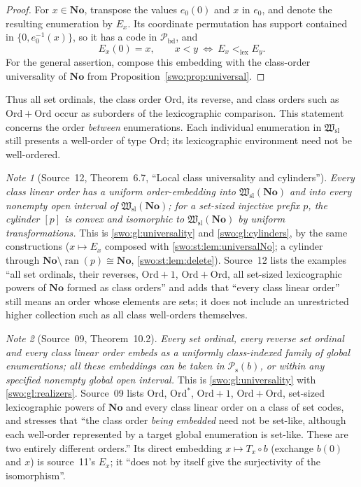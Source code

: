 \documentclass[11pt]{article}
\theoremstyle{definition}
\theoremstyle{remark}
\newtheorem{note}[note]{Note}
\newcommand{\No}{\mathbf{No}}
\newcommand{\Ord}{\mathrm{Ord}}
\newcommand{\Hsl}{\mathfrak W_{\mathrm{sl}}}
\newcommand{\Pbd}{\mathcal P_{\mathrm{bd}}}
\newcommand{\Psupp}{\mathcal P_{\mathrm{s}}}
\newcommand{\lex}{\mathrm{lex}}
\newcommand{\ran}{\operatorname{ran}}
\begin{document}
\begin{proof}
For $x\in\No$, transpose the values $e_0(0)$ and $x$ in $e_0$, and denote
the resulting enumeration by $E_x$.  Its coordinate permutation has support
contained in $\{0,e_0^{-1}(x)\}$, so it has a code in $\Pbd$, and
\[
 E_x(0)=x,\qquad x<y\ \Longleftrightarrow\ E_x<_{\lex}E_y.
\]
For the general assertion, compose this embedding with the class-order
universality of $\No$ from Proposition~\ref{swo:prop:universal}.
\end{proof}

Thus all set ordinals, the class order $\Ord$, its reverse, and class orders
such as $\Ord+\Ord$ occur as suborders of the lexicographic comparison.
This statement concerns the order \emph{between} enumerations.  Each
individual enumeration in $\Hsl$ still presents a well-order of type
$\Ord$; its lexicographic environment need not be well-ordered.


\begin{note}[Source~12, Theorem~6.7, ``Local class universality and cylinders'']\label{swo:st:thm:local}
\emph{Every class linear order has a uniform order-embedding into $\Hsl(\No)$
and into every nonempty open interval of $\Hsl(\No)$; for a set-sized
injective prefix $p$, the cylinder $[p]$ is convex and isomorphic to
$\Hsl(\No)$ by uniform transformations.} This is \cref{swo:gl:universality}
and \cref{swo:gl:cylinders}, by the same constructions ($x\mapsto E_x$
composed with \cref{swo:st:lem:universalNo}; a cylinder through
$\No\setminus\ran(p)\cong\No$, \cref{swo:st:lem:delete}). Source~12 lists
the examples ``all set ordinals, their reverses, $\Ord+1$, $\Ord+\Ord$, all
set-sized lexicographic powers of $\No$ formed as class orders'' and adds that
``every class linear order'' still means an order whose elements are sets; it
does not include an unrestricted higher collection such as all class
well-orders themselves.
\end{note}


\begin{note}[Source~09, Theorem~10.2]\label{swo:ec:thm:global-spectrum}
\emph{Every set ordinal, every reverse set ordinal and every class linear order
embeds as a uniformly class-indexed family of global enumerations; all these
embeddings can be taken in $\Psupp(b)$, or within any specified nonempty
global open interval.} This is \cref{swo:gl:universality} with
\cref{swo:gl:realizers}. Source~09 lists $\Ord$, $\Ord^*$, $\Ord+1$,
$\Ord+\Ord$, set-sized lexicographic powers of $\No$ and every class linear
order on a class of set codes, and stresses that ``the class order
\emph{being embedded} need not be set-like, although each well-order
represented by a target global enumeration is set-like. These are two
entirely different orders.'' Its direct embedding $x\mapsto T_x\circ b$
(exchange $b(0)$ and $x$) is source~11's $E_x$; it ``does not by itself give
the surjectivity of the isomorphism''.
\end{note}
\end{document}
